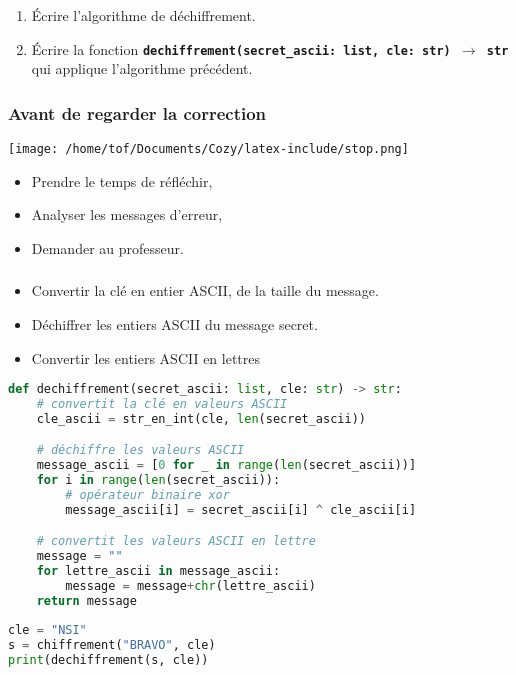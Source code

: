 \documentclass[svgnames,11pt]{beamer}
\begin{document}
\begin{frame}
    \frametitle{}

\begin{activite}
\begin{enumerate}
    \item Écrire l'algorithme de déchiffrement.
    \item Écrire la fonction \textbf{\texttt{dechiffrement(secret\_ascii: list, cle: str) $\rightarrow$ str}} qui applique l'algorithme précédent.
\end{enumerate}
\end{activite}
\end{frame}
\begin{frame}
    \frametitle{Avant de regarder la correction}
\begin{center}
    \centering
    \texttt{[image: /home/tof/Documents/Cozy/latex-include/stop.png]}
    \end{center}
{\Large
    \begin{itemize}
        \item Prendre le temps de réfléchir,
        \item Analyser les messages d'erreur,
        \item Demander au professeur.
    \end{itemize}
}
\end{frame}
\begin{frame}
    \frametitle{}
\begin{itemize}
    \item Convertir la clé en entier ASCII, de la taille du message.
    \item Déchiffrer les entiers ASCII du message secret.
    \item Convertir les entiers ASCII en lettres
\end{itemize}
    

\end{frame}
\begin{frame}[fragile]
\begin{center}
\begin{lstlisting}[language=Python , basicstyle=\ttfamily\small, xleftmargin=0.2em, xrightmargin=-2.5em]
def dechiffrement(secret_ascii: list, cle: str) -> str:
    # convertit la clé en valeurs ASCII
    cle_ascii = str_en_int(cle, len(secret_ascii))

    # déchiffre les valeurs ASCII
    message_ascii = [0 for _ in range(len(secret_ascii))]
    for i in range(len(secret_ascii)):
        # opérateur binaire xor
        message_ascii[i] = secret_ascii[i] ^ cle_ascii[i]

    # convertit les valeurs ASCII en lettre
    message = ""
    for lettre_ascii in message_ascii:
        message = message+chr(lettre_ascii)
    return message
\end{lstlisting}
\begin{lstlisting}[language=Python , basicstyle=\ttfamily\small, xleftmargin=0.2em, xrightmargin=-2.5em]
cle = "NSI"
s = chiffrement("BRAVO", cle)
print(dechiffrement(s, cle))
\end{lstlisting}
\end{center}
    

\end{frame}
\end{document}
